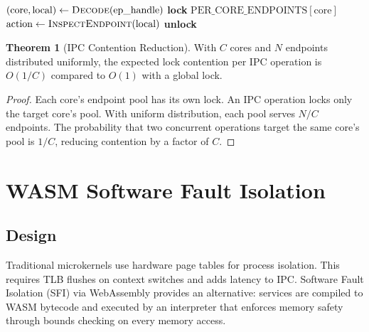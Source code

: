 \documentclass[11pt,letterpaper]{article}
\theoremstyle{definition}
\newtheorem{theorem}{Theorem}[section]
\begin{document}
\begin{algorithm}[h]
\caption{Per-Core IPC Send}
\begin{algorithmic}[1]
    \State $(\text{core}, \text{local}) \gets \Call{Decode}{\text{ep\_handle}}$
        \State {}
    \Else
        \State \textbf{lock} $\text{PER\_CORE\_ENDPOINTS}[\text{core}]$
        \State $\text{action} \gets \Call{InspectEndpoint}{\text{local}}$
        \State \textbf{unlock}
        \State {}
            \State {}
            \State {}
        \EndIf
    \EndIf
\EndProcedure
\end{algorithmic}
\end{algorithm}

\begin{theorem}[IPC Contention Reduction]
With $C$ cores and $N$ endpoints distributed uniformly, the expected lock
contention per IPC operation is $O(1/C)$ compared to $O(1)$ with a global
lock.
\end{theorem}

\begin{proof}
Each core's endpoint pool has its own lock. An IPC operation locks only the
target core's pool. With uniform distribution, each pool serves $N/C$
endpoints. The probability that two concurrent operations target the same
core's pool is $1/C$, reducing contention by a factor of $C$.
\end{proof}

\section{WASM Software Fault Isolation}
\label{sec:wasm}

\subsection{Design}

Traditional microkernels use hardware page tables for process isolation. This
requires TLB flushes on context switches and adds latency to IPC. Software
Fault Isolation (SFI) via WebAssembly provides an alternative: services are
compiled to WASM bytecode and executed by an interpreter that enforces memory
safety through bounds checking on every memory access.
\end{document}
